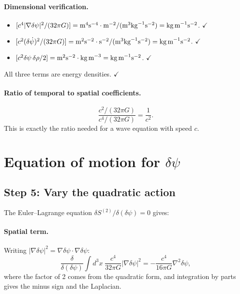 \documentclass[aps,prd,twocolumn,nofootinbib]{revtex4-2}
\newcommand{\dpsi}{\delta\psi}
\begin{document}
\paragraph{Dimensional verification.}
\begin{itemize}
\item $[c^4|\nabla\dpsi|^2/(32\pi G)]
  = \text{m}^4\text{s}^{-4}\cdot\text{m}^{-2}
    /(\text{m}^3\text{kg}^{-1}\text{s}^{-2})
  = \text{kg\,m}^{-1}\text{s}^{-2}$. $\checkmark$
\item $[c^2(\delta\dot\psi)^2/(32\pi G)]
  = \text{m}^2\text{s}^{-2}\cdot\text{s}^{-2}
    /(\text{m}^3\text{kg}^{-1}\text{s}^{-2})
  = \text{kg\,m}^{-1}\text{s}^{-2}$. $\checkmark$
\item $[c^2\dpsi\,\delta\rho/2]
  = \text{m}^2\text{s}^{-2}\cdot\text{kg\,m}^{-3}
  = \text{kg\,m}^{-1}\text{s}^{-2}$. $\checkmark$
\end{itemize}
All three terms are energy densities. $\checkmark$

\paragraph{Ratio of temporal to spatial coefficients.}
\begin{equation}
\frac{c^2/(32\pi G)}{c^4/(32\pi G)} = \frac{1}{c^2}.
\end{equation}
This is exactly the ratio needed for a wave equation with speed $c$.

\section{Equation of motion for $\dpsi$}
\label{sec:EOM}

\subsection{Step 5: Vary the quadratic action}

The Euler--Lagrange equation $\delta S^{(2)}/\delta(\dpsi) = 0$ gives:

\paragraph{Spatial term.} Writing $|\nabla\dpsi|^2
= \nabla\dpsi\cdot\nabla\dpsi$:
\begin{equation}
\frac{\delta}{\delta(\dpsi)}\int d^3x\;\frac{c^4}{32\pi G}|\nabla\dpsi|^2
= -\frac{c^4}{16\pi G}\nabla^2\dpsi,
\end{equation}
where the factor of 2 comes from the quadratic form, and integration
by parts gives the minus sign and the Laplacian.
\end{document}
